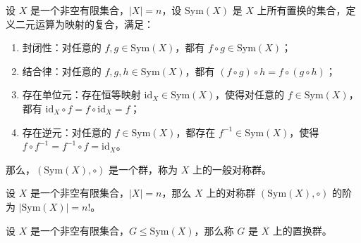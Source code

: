 \begin{definition}
    设 $X$ 是一个非空有限集合，$|X| = n$，设 $\mathrm{Sym}(X)$ 是 $X$ 上所有置换的集合，定义二元运算为映射的复合，满足：
    \begin{enumerate}
        \item 封闭性：对任意的 $f, g\in \mathrm{Sym}(X)$，都有 $f \circ g \in \mathrm{Sym}(X)$；
        \item 结合律：对任意的 $f, g, h\in \mathrm{Sym}(X)$，都有 $(f \circ g) \circ h = f \circ (g \circ h)$；
        \item 存在单位元：存在恒等映射 $\mathrm{id}_X\in \mathrm{Sym}(X)$，使得对任意的 $f\in \mathrm{Sym}(X)$，都有 $\mathrm{id}_X \circ f = f \circ \mathrm{id}_X = f$；
        \item 存在逆元：对任意的 $f\in \mathrm{Sym}(X)$，都存在 $f^{-1}\in \mathrm{Sym}(X)$，使得 $f \circ f^{-1} = f^{-1} \circ f = \mathrm{id}_X$。
    \end{enumerate}
    那么，$(\mathrm{Sym}(X),\circ)$ 是一个群，称为 $X$ 上的一般对称群。
\end{definition}

\begin{proposition}
    设 $X$ 是一个非空有限集合，$|X| = n$，那么 $X$ 上的对称群 $(\mathrm{Sym}(X),\circ)$ 的阶为 $|\mathrm{Sym}(X)|=n!$。
\end{proposition}

\begin{definition}
    设 $X$ 是一个非空有限集合，$G\le \mathrm{Sym}(X)$，那么称 $G$ 是 $X$ 上的置换群。
\end{definition}

